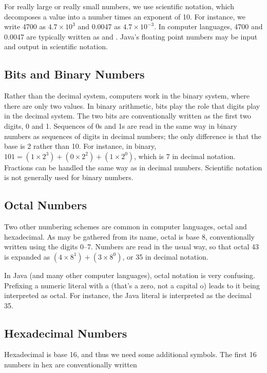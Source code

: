 For really large or really small numbers, we use scientific notation,
which decomposes a value into a number times an exponent of 10.  For
instance, we write 4700 as $4.7 \times 10^3$ and 0.0047 as $4.7 \times
10^{-3}$.  In computer languages, 4700 and 0.0047 are typically
written as  and .  Java's floating point
numbers may be input and output in scientific notation.

\subsection{Bits and Binary Numbers}

Rather than the decimal system, computers work in the binary system,
where there are only two values.  In binary arithmetic, bits play the
role that digits play in the decimal system.  The two bits are
conventionally written as the first two digits, 0 and 1.  Sequences of
0s and 1s are read in the same way in binary numbers as sequences of
digits in decimal numbers; the only difference is that the base is 2
rather than 10.  For instance, in binary, $101 = (1 \times 2^3) + (0
\times 2^2) + (1 \times 2^0)$, which is 7 in decimal notation.  Fractions
can be handled the same way as in decimal numbers.  Scientific notation
is not generally used for binary numbers.

\subsection{Octal Numbers}

Two other numbering schemes are common in computer languages, octal
and hexadecimal.  As may be gathered from its name, octal is base 8,
conventionally written using the digits 0--7.  Numbers are read in the
usual way, so that octal 43 is expanded as $(4 \times 8^1) + (3 \times
8^0)$, or 35 in decimal notation.

In Java (and many other computer languages), octal notation is very
confusing.  Prefixing a numeric literal with a  (that's a
zero, not a capital o) leads to it being interpreted as octal.  For
instance, the Java literal  is interpreted as the decimal
35.

\subsection{Hexadecimal Numbers}

Hexadecimal is base 16, and thus we need some additional symbols.
The first 16 numbers in hex are conventionally written

